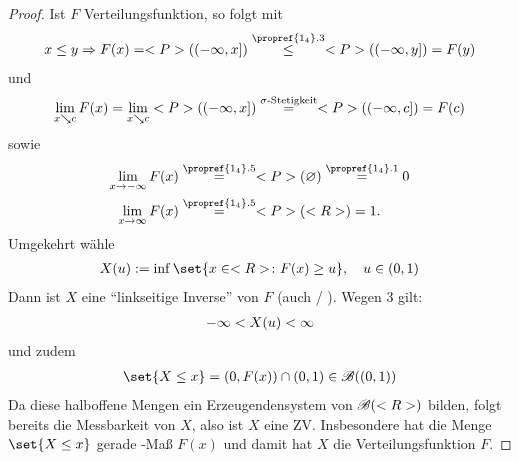 \begin{proof}
	Ist $F$ Verteilungsfunktion, so folgt mit 
	\begin{align}
		 x \le y \Rightarrow F(x) = \probp((-\infty,x]) \overset{\propref{1_4}.3}{\le} \probp((-\infty,y]) = F(y)\notag
	\end{align}
	und
	\begin{align}
		\lim_{x \searrow c} F(x) = \lim_{x \searrow c} <P>((-\infty, x]) \overset{\sigma\text{-Stetigkeit}}{=} <P>((-\infty, c]) = F(c)\notag
	\end{align}
	sowie
	\begin{align}
		\lim_{x\to -\infty} F(x) &\overset{\propref{1_4}.5}{=} \probp(\emptyset) \overset{\propref{1_4}.1}{=} 0\notag\\
		\lim_{x\to \infty} F(x) &\overset{\propref{1_4}.5}{=} \probp(\R) = 1.\notag
	\end{align}
	Umgekehrt wähle
	\begin{align}
		X(u) := \inf\set{x \in \R \colon F(x) \ge u}, \quad u \in (0,1)\notag
	\end{align}
	Dann ist $X$ eine ``linkseitige Inverse'' von $F$ (auch  / ).
	Wegen 3 gilt:
	\begin{align}
		-\infty < X(u) < \infty\notag
	\end{align}
	und zudem
	\begin{align}
		\set{X \le x} = (0, F(x)) \cap (0,1) \in \borel((0,1))\notag
	\end{align}
	Da diese halboffene Mengen ein Erzeugendensystem von $\mathscr{B}(<R>)$ bilden, folgt bereits die Messbarkeit von $X$, also ist $X$ eine ZV. Insbesondere hat die Menge $\set{X \le x}$ gerade -Maß $F(x)$ und damit hat $X$ die Verteilungsfunktion $F$.
\end{proof}

